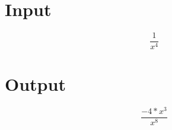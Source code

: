 \documentclass[a4paper, 12pt]{article}
\begin{document}
\Large
\section{Input}

\[\frac{1 }{x ^ 4 }\]
\section{Output}

\[\frac{-4 * x ^ 3 }{x ^ 8 }\]
\end{document}
